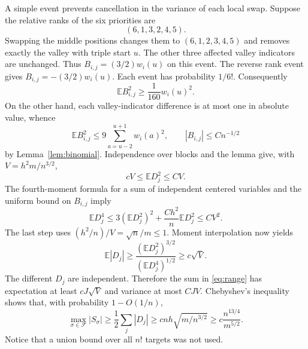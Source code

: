 \documentclass[11pt]{article}
\newcommand{\E}{\mathbb E}
\begin{document}
A simple event prevents cancellation in the variance of each local swap.
Suppose the relative ranks of the six priorities are
\[
 (6,1,3,2,4,5).
\]
Swapping the middle positions changes them to $(6,1,2,3,4,5)$ and removes
exactly the valley with triple start $u$. The other three affected valley
indicators are unchanged. Thus $B_{i,j}=(3/2)w_i(u)$ on this event.
The reverse rank event gives $B_{i,j}=-(3/2)w_i(u)$. Each event has
probability $1/6!$. Consequently
\begin{equation}\label{eq:variance}
 \E B_{i,j}^2\geq\frac1{160}w_i(u)^2.
\end{equation}
On the other hand, each valley-indicator difference is at most one in
absolute value, whence
\[
 \E B_{i,j}^2\leq9\sum_{a=u-2}^{u+1}w_i(a)^2,
 \qquad |B_{i,j}|\leq Cn^{-1/2}
\]
by Lemma~\ref{lem:binomial}. Independence over blocks and the lemma give,
with $V=h^2m/n^{3/2}$,
\[
 cV\leq\E D_j^2\leq CV.
\]
The fourth-moment formula for a sum of independent centered variables and
the uniform bound on $B_{i,j}$ imply
\[
 \E D_j^4\leq3(\E D_j^2)^2
       +\frac{Ch^2}{n}\E D_j^2
 \leq CV^2.
\]
The last step uses $(h^2/n)/V=\sqrt n/m\leq1$.
Moment interpolation now yields
\[
 \E|D_j|\geq\frac{(\E D_j^2)^{3/2}}{(\E D_j^4)^{1/2}}
               \geq c\sqrt V.
\]
The different $D_j$ are independent. Therefore the sum in
\eqref{eq:range} has expectation at least $cJ\sqrt V$ and variance at most
$CJV$. Chebyshev's inequality shows that, with probability $1-O(1/n)$,
\begin{equation}\label{eq:triplelower}
 \max_{\sigma\in\mathcal F}|S_\sigma|
 \geq\frac12\sum_j|D_j|
 \geq c n h\sqrt{m/n^{3/2}}
 \geq c\frac{n^{13/4}}{m^{5/2}}.
\end{equation}
Notice that a union bound over all $n!$ targets was not used.
\end{document}
